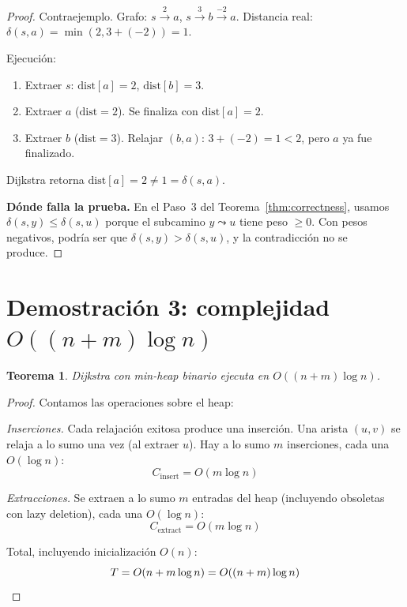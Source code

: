 \documentclass[11pt, letterpaper]{article}
\theoremstyle{definition}
\theoremstyle{plain}
\newtheorem{theorem}{Teorema}[section]
\theoremstyle{remark}
\begin{document}
\begin{proof}
Contraejemplo. Grafo:
$s \xrightarrow{2} a$, $s \xrightarrow{3} b \xrightarrow{-2} a$.
Distancia real: $\delta(s,a) = \min(2, 3{+}({-}2)) = 1$.

Ejecución:
\begin{enumerate}
  \item Extraer $s$: $\mathrm{dist}[a] = 2$,
    $\mathrm{dist}[b] = 3$.
  \item Extraer $a$ ($\mathrm{dist} = 2$). Se finaliza con
    $\mathrm{dist}[a] = 2$.
  \item Extraer $b$ ($\mathrm{dist} = 3$). Relajar $(b,a)$:
    $3 + ({-}2) = 1 < 2$, pero $a$ ya fue finalizado.
\end{enumerate}

Dijkstra retorna $\mathrm{dist}[a] = 2 \neq 1 = \delta(s,a)$.

\textbf{Dónde falla la prueba.} En el Paso~3 del
Teorema~\ref{thm:correctness}, usamos
$\delta(s,y) \leq \delta(s,u)$ porque el subcamino $y \leadsto u$
tiene peso $\geq 0$. Con pesos negativos, podría ser que
$\delta(s,y) > \delta(s,u)$, y la contradicción no se produce.
\end{proof}

\section{Demostración 3: complejidad
  \texorpdfstring{$O((n+m)\log n)$}{O((n+m) log n)}}

\begin{theorem}\label{thm:complexity}
Dijkstra con min-heap binario ejecuta en $O((n+m)\log n)$.
\end{theorem}

\begin{proof}
Contamos las operaciones sobre el heap:

\emph{Inserciones.} Cada relajación exitosa produce una inserción.
Una arista $(u,v)$ se relaja a lo sumo una vez (al extraer $u$). Hay
a lo sumo $m$ inserciones, cada una $O(\log n)$:
\[
  C_{\text{insert}} = O(m \log n)
\]

\emph{Extracciones.} Se extraen a lo sumo $m$ entradas del heap
(incluyendo obsoletas con lazy deletion), cada una $O(\log n)$:
\[
  C_{\text{extract}} = O(m \log n)
\]

Total, incluyendo inicialización $O(n)$:
\[
  T = O(n + m\log n) = O((n+m)\log n) \qedhere
\]
\end{proof}
\end{document}
